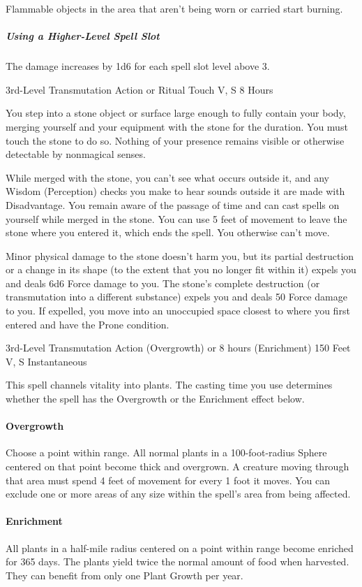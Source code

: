 \documentclass[letterpaper,openany,oneside,twocolumn]{book}
\begin{document}
Flammable objects in the area that aren't being worn or carried start burning.

\subparagraph*{Using a Higher-Level Spell Slot} The damage increases by 1d6 for each spell slot level above 3.

	{3rd-Level Transmutation}
	{Action or Ritual}
	{Touch}
	{V, S}
	{8 Hours}

You step into a stone object or surface large enough to fully contain your body, merging yourself and your equipment with the stone for the duration. You must touch the stone to do so. Nothing of your presence remains visible or otherwise detectable by nonmagical senses.

While merged with the stone, you can't see what occurs outside it, and any Wisdom (Perception) checks you make to hear sounds outside it are made with Disadvantage. You remain aware of the passage of time and can cast spells on yourself while merged in the stone. You can use 5 feet of movement to leave the stone where you entered it, which ends the spell. You otherwise can't move.

Minor physical damage to the stone doesn't harm you, but its partial destruction or a change in its shape (to the extent that you no longer fit within it) expels you and deals 6d6 Force damage to you. The stone's complete destruction (or transmutation into a different substance) expels you and deals 50 Force damage to you. If expelled, you move into an unoccupied space closest to where you first entered and have the Prone condition.

	{3rd-Level Transmutation}
	{Action (Overgrowth) or 8 hours (Enrichment)}
	{150 Feet}
	{V, S}
	{Instantaneous}

This spell channels vitality into plants. The casting time you use determines whether the spell has the Overgrowth or the Enrichment effect below.

\paragraph*{Overgrowth} Choose a point within range. All normal plants in a 100-foot-radius Sphere centered on that point become thick and overgrown. A creature moving through that area must spend 4 feet of movement for every 1 foot it moves. You can exclude one or more areas of any size within the spell's area from being affected.

\paragraph*{Enrichment} All plants in a half-mile radius centered on a point within range become enriched for 365 days. The plants yield twice the normal amount of food when harvested. They can benefit from only one Plant Growth per year.
\end{document}
